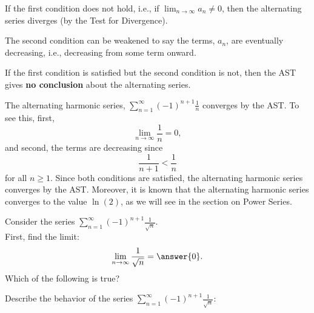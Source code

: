 \documentclass{ximera}
\begin{document}
\begin{remark} If the first condition does not hold, i.e., if 
$\displaystyle{\lim_{n\to\infty} a_n \neq 0}$, 
then the alternating series diverges (by the Test for Divergence).
\end{remark}

\begin{remark}
The second condition can be weakened to say the terms, $a_n$, are eventually decreasing, i.e., decreasing from some term onward.
\end{remark}

\begin{remark} 
If the first condition is satisfied but the second condition is not, then the AST gives \textbf{no conclusion} about the alternating series.
\end{remark}

\begin{example} The alternating harmonic series, 
$\displaystyle{\sum_{n=1}^\infty (-1)^{n+1} \frac{1}{n}}$ converges by the AST. 
To see this, first, 
\[
\lim_{n\to\infty} \frac{1}{n} = 0,
\]
and second,
the terms are decreasing since 
\[
\frac{1}{n+1} < \frac{1}{n}
\]
for all $n \geq 1$. Since both conditions are satisfied, the alternating harmonic series converges by the AST.
Moreover, it is known that the alternating harmonic series converges to the value $\ln(2)$, as we will see in the section on Power Series.
\end{example}

\begin{problem}
Consider the series $\displaystyle{\sum_{n=1}^\infty (-1)^{n+1} \frac{1}{\sqrt n}}$.\\
First, find the limit:
\[
\lim_{n\to\infty} \frac{1}{\sqrt n} = \answer{0}.
\]
Which of the following is true?
\begin{multipleChoice}
\end{multipleChoice}


Describe the behavior of the series $\displaystyle{\sum_{n=1}^\infty (-1)^{n+1} \frac{1}{\sqrt n}:}$
\begin{multipleChoice}
\end{multipleChoice}

\end{problem}
\end{document}

